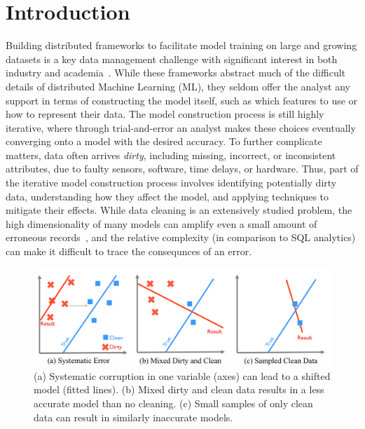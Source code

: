 \section{Introduction}
Building distributed frameworks to facilitate model training on large and growing datasets is a key data management challenge with significant interest in both industry and academia~\cite{bdas, alexandrov2014stratosphere, crotty2014tupleware, tensor}.
While these frameworks abstract much of the difficult details of distributed Machine Learning (ML), they seldom offer the analyst any support in terms of constructing the model itself, such as which features to use or how to represent their data.
The model construction process is still highly iterative, where through trial-and-error an analyst makes these choices eventually converging onto a model with the desired accuracy.
To further complicate matters, data often arrives \emph{dirty}, including missing, incorrect, or inconsistent attributes, due to faulty sensors, software, time delays, or hardware.
Thus, 
part of the iterative model construction process involves identifying potentially dirty data, understanding how they affect the model, and applying techniques to mitigate their effects.  
While data cleaning is an extensively studied problem, the high dimensionality of many models can amplify even a small amount of erroneous records~\cite{xiaofeature}, and the relative complexity (in comparison to SQL analytics) can make it difficult to trace the consequnces of an error.

\begin{figure}[t]
\centering
 \includegraphics[width=\columnwidth]{figs/update-arch.png}
 \caption{ (a) Systematic corruption in one variable (axes) can lead to a shifted model (fitted lines). 
 (b) Mixed dirty and clean data results in a less accurate model than no cleaning.
(c) Small samples of only clean data can result in similarly inaccurate models. \label{update-arch1}}
\end{figure}

